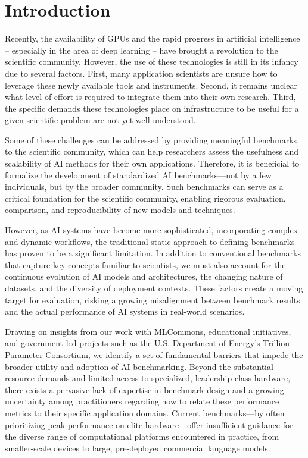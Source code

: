 \section{Introduction}
\label{sec:intro}
Recently, the availability of GPUs and the rapid progress in artificial intelligence -- especially in the area of deep learning -- have brought a revolution to the scientific community. However, the use of these technologies is still in its infancy due to several factors. First, many application scientists are unsure how to leverage these newly available tools and instruments. Second, it remains unclear what level of effort is required to integrate them into their own research. Third, the specific demands these technologies place on infrastructure to be useful for a given scientific problem are not yet well understood.

Some of these challenges can be addressed by providing meaningful benchmarks to the scientific community, which can help researchers assess the usefulness and scalability of AI methods for their own applications. Therefore, it is beneficial to formalize the development of standardized AI benchmarks—not by a few individuals, but by the broader community. Such benchmarks can serve as a critical foundation for the scientific community, enabling rigorous evaluation, comparison, and reproducibility of new models and techniques.

However, as AI systems have become more sophisticated, incorporating complex and dynamic workflows, the traditional static approach to defining benchmarks has proven to be a significant limitation. In addition to conventional benchmarks that capture key concepts familiar to scientists, we must also account for the continuous evolution of AI models and architectures, the changing nature of datasets, and the diversity of deployment contexts. These factors create a moving target for evaluation, risking a growing misalignment between benchmark results and the actual performance of AI systems in real-world scenarios.

Drawing on insights from our work with MLCommons, educational initiatives, and government-led projects such as the U.S. Department of Energy’s Trillion Parameter Consortium, we identify a set of fundamental barriers that impede the broader utility and adoption of AI benchmarking. Beyond the substantial resource demands and limited access to specialized, leadership-class hardware, there exists a pervasive lack of expertise in benchmark design and a growing uncertainty among practitioners regarding how to relate these performance metrics to their specific application domains. Current benchmarks—by often prioritizing peak performance on elite hardware—offer insufficient guidance for the diverse range of computational platforms encountered in practice, from smaller-scale devices to large, pre-deployed commercial language models.

